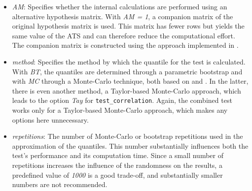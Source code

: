 \begin{itemize}
  \begin{itemize}
  \item
    For \texttt{test\_covariance} and \texttt{test\_correlation}, more experienced
    users can specify custom hypotheses through a hypothesis
    matrix together with a corresponding vector, as introduced in
    \citet{sattler2022} or \citet{sattler2023}, especially for
    less standard hypotheses, which increases flexibility. Both refer
    to the corresponding kind of upper triangular vectorization, and
    unlike in other procedures, the hypothesis matrix here need
    be neither a projection matrix nor square. This especially
    allows structures from the linear covariance structure model and
    the linear correlation structure model by using the function
    \texttt{get\_hypothesis}.
  \item
    The function \texttt{test\_combined}, which jointly assesses the
    equality of covariance and correlation matrices, is restricted to
    one specific hypothesis. Consequently, this argument is not
    available in that context.
  \end{itemize}
\item
  \emph{AM}: Specifies whether the internal calculations are performed using an
  alternative hypothesis matrix. With \emph{AM = 1}, a companion matrix of
  the original hypothesis matrix is used. This matrix has fewer rows
  but yields the same value of the ATS and can therefore reduce the
  computational effort. The companion matrix is constructed using the
  approach implemented in \citet{HypoShrink}.
\item
  \emph{method}: Specifies the method by which the quantile for the test is
  calculated. With \emph{BT}, the quantiles are determined through a
  parametric bootstrap and with \emph{MC} through a Monte-Carlo technique,
  both based on \citet{sattler2022} and \citet{sattler2023}. In
  the latter, there is even another method, a Taylor-based Monte-Carlo
  approach, which leads to the option \emph{Tay} for \texttt{test\_correlation}.
  Again, the combined test works only for a Taylor-based Monte-Carlo
  approach, which makes any options here unnecessary.
\item
  \emph{repetitions}: The number of Monte-Carlo or bootstrap repetitions
  used in the approximation of the quantiles. This number
  substantially influences both the test's performance and its
  computation time. Since a small number of repetitions increases the
  influence of the randomness on the results, a predefined value of
  \emph{1000} is a good trade-off, and substantially smaller numbers are not
  recommended.
\end{itemize}

